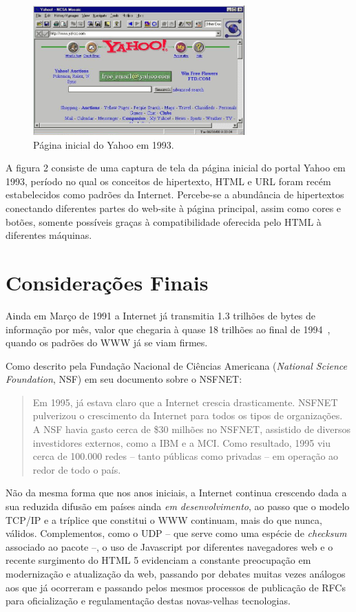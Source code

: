 \documentclass[conference]{IEEEtran}
\begin{document}
	
	\begin{figure}[h]
		\centering
		\includegraphics[width=3.2in]{yahoo1993}
		\caption{Página inicial do Yahoo em 1993.~\cite{yahoo}}
	\end{figure}
	
	A figura 2 consiste de uma captura de tela da página inicial do portal Yahoo em 1993, período no qual os conceitos de hipertexto, HTML e URL foram recém estabelecidos como padrões da Internet. Percebe-se a abundância de hipertextos conectando diferentes partes do web-site à página principal, assim como cores e botões, somente possíveis graças à compatibilidade oferecida pelo HTML à diferentes máquinas.

\section{Considerações Finais}

  Ainda em Março de 1991 a Internet já transmitia 1.3 trilhões de bytes de
  informação por mês, valor que chegaria à quase 18 trilhões ao final de 1994~\cite{nsfnet}, quando os padrões do WWW já se viam firmes.
  
  Como descrito pela Fundação Nacional de Ciências Americana (\emph{National Science Foundation}, NSF) em seu documento sobre o NSFNET:

  \begin{quote}

    Em 1995, já estava claro que a Internet crescia drasticamente.
    NSFNET pulverizou o crescimento da Internet para todos os tipos de
    organizações. A NSF havia gasto cerca de \$30 milhões no NSFNET, assistido
    de diversos investidores externos, como a IBM e a MCI. Como resultado, 1995
    viu cerca de 100.000 redes -- tanto públicas como privadas -- em operação ao
    redor de todo o país.~\cite{nsfnet}
    
  \end{quote}
  
  Não da mesma forma que nos anos iniciais, a Internet
  continua crescendo dada a sua reduzida difusão em países ainda \emph{em
    desenvolvimento}, ao passo que o modelo TCP/IP e a tríplice que constitui o WWW continuam, mais do que nunca, válidos. Complementos, como o UDP -- que serve como uma espécie de \emph{checksum} associado ao pacote --, o uso de Javascript por diferentes navegadores web e o recente surgimento do HTML 5 evidenciam a constante preocupação em modernização e atualização da web, passando por debates muitas vezes análogos aos que já ocorreram e passando pelos mesmos processos de publicação de RFCs para oficialização e regulamentação destas novas-velhas tecnologias.
  
\end{document}
